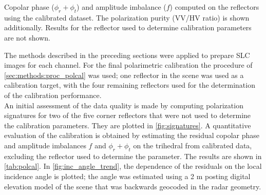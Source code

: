 				
\begin{table}[ht!]
	\centering
	\caption{Copolar phase ($\phi_r + \phi_t$) and amplitude imbalance ($f$) computed on the reflectors using the calibrated dataset. The polarization purity (VV/HV ratio) is shown additionally. Results for the reflector used to determine calibration parameters are not shown.}
	\label{tab:polcal}
\end{table}		
The methods described in the preceding sections were applied to prepare SLC images for each channel. For the final polarimetric calibration the procedure of \autoref{sec:methods:proc_polcal} was used; one reflector in the scene was used as a calibration target, with the four remaining reflectors used for the determination of the calibration performance.\\
An initial assessment of the data quality is made  by computing polarization signatures\cite{VanZyl1987} for two of the five corner reflectors that were not used to determine the calibration parameters. They are plotted in \autoref{fig:signatures}. A quantitative evaluation of the calibration is obtained by estimating the residual copolar phase and amplitude imbalances $f$ and $\phi_r + \phi_t$ on the trihedral from calibrated data, excluding the reflector used to determine the parameter. The results are shown in \autoref{tab:polcal}.
In \autoref{fig:inc_angle_trend}, the dependence of the residuals on the local incidence angle is plotted; the angle was estimated using a 2 m posting digital elevation model of the scene that was backwards geocoded in the radar geometry.